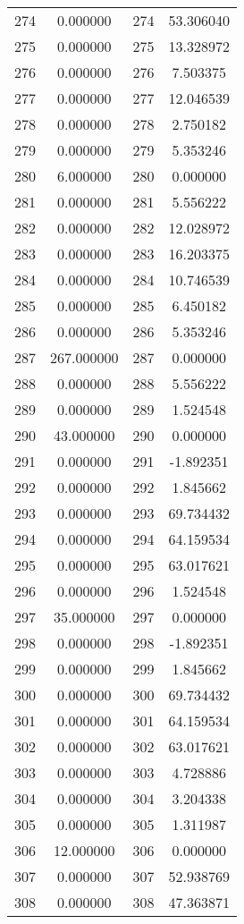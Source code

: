 \documentclass[12pt]{article}
\begin{document}
\begin{longtable}{@{}cccc@{}}
274 & 0.000000 & 274 & 53.306040 \\
275 & 0.000000 & 275 & 13.328972 \\
276 & 0.000000 & 276 & 7.503375 \\
277 & 0.000000 & 277 & 12.046539 \\
278 & 0.000000 & 278 & 2.750182 \\
279 & 0.000000 & 279 & 5.353246 \\
280 & 6.000000 & 280 & 0.000000 \\
281 & 0.000000 & 281 & 5.556222 \\
282 & 0.000000 & 282 & 12.028972 \\
283 & 0.000000 & 283 & 16.203375 \\
284 & 0.000000 & 284 & 10.746539 \\
285 & 0.000000 & 285 & 6.450182 \\
286 & 0.000000 & 286 & 5.353246 \\
287 & 267.000000 & 287 & 0.000000 \\
288 & 0.000000 & 288 & 5.556222 \\
289 & 0.000000 & 289 & 1.524548 \\
290 & 43.000000 & 290 & 0.000000 \\
291 & 0.000000 & 291 & -1.892351 \\
292 & 0.000000 & 292 & 1.845662 \\
293 & 0.000000 & 293 & 69.734432 \\
294 & 0.000000 & 294 & 64.159534 \\
295 & 0.000000 & 295 & 63.017621 \\
296 & 0.000000 & 296 & 1.524548 \\
297 & 35.000000 & 297 & 0.000000 \\
298 & 0.000000 & 298 & -1.892351 \\
299 & 0.000000 & 299 & 1.845662 \\
300 & 0.000000 & 300 & 69.734432 \\
301 & 0.000000 & 301 & 64.159534 \\
302 & 0.000000 & 302 & 63.017621 \\
303 & 0.000000 & 303 & 4.728886 \\
304 & 0.000000 & 304 & 3.204338 \\
305 & 0.000000 & 305 & 1.311987 \\
306 & 12.000000 & 306 & 0.000000 \\
307 & 0.000000 & 307 & 52.938769 \\
308 & 0.000000 & 308 & 47.363871 \\

\end{longtable}
\end{document}
